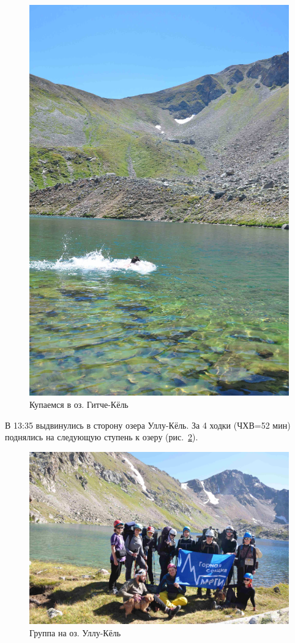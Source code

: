\begin{figure}[h!]
	\centering
	\begin{turn}{0}
		\includegraphics[width=0.7\linewidth]{../pics/DSC_0774}
	\end{turn}
	\caption{Купаемся в оз. Гитче-Кёль}
	\label{fig:DSC_0774}
\end{figure}


В 13:35 выдвинулись в сторону озера Уллу-Кёль. За 4 ходки (ЧХВ=52 мин) поднялись на следующую ступень к озеру (рис.~\ref{fig:DSC_0800}). 

\begin{figure}[h!]
	\centering
	\includegraphics[width=0.7\linewidth]{../pics/DSC_0800}
	\caption{Группа на оз. Уллу-Кёль}
	\label{fig:DSC_0800}
\end{figure}

